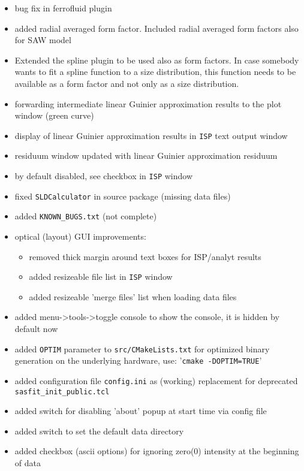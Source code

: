 \begin{description}
\begin{itemize}
        \item bug fix in ferrofluid plugin
        \item added radial averaged form factor. Included radial averaged form factors also for SAW model
        \item Extended the spline plugin to be used also as form factors. In case somebody wants to fit a spline function to a size distribution, this function needs to be available as a form factor and not only as a size distribution.
        \item forwarding intermediate linear Guinier approximation results to the plot window (green curve)
        \item display of linear Guinier approximation results in \texttt{ISP} text output window
        \item residuum window updated with linear Guinier approximation residuum
        \item by default disabled, see checkbox in \texttt{ISP} window
        \item fixed \texttt{SLDCalculator} in source package (missing data files)
        \item added \texttt{KNOWN\_BUGS.txt} (not complete)
        \item optical (layout) GUI improvements:
            \begin{itemize}
            \item removed thick margin around text boxes for ISP/analyt results
            \item added resizeable file list in \texttt{ISP} window
            \item added resizeable 'merge files' list when loading data files
            \end{itemize}
        \item added menu->tools->toggle console to show the console, it is hidden by default now
        \item added \texttt{OPTIM} parameter to \texttt{src/CMakeLists.txt} for optimized binary generation on the underlying hardware, use: '\texttt{cmake -DOPTIM=TRUE}'
        \item added configuration file \texttt{config.ini} as (working) replacement for deprecated \texttt{sasfit\_init\_public.tcl}
        \item added switch for disabling 'about' popup at start time via config file
        \item added switch to set the default data directory
        \item added checkbox (ascii options) for ignoring zero(0) intensity at the beginning of data

\end{itemize}
\end{description}
